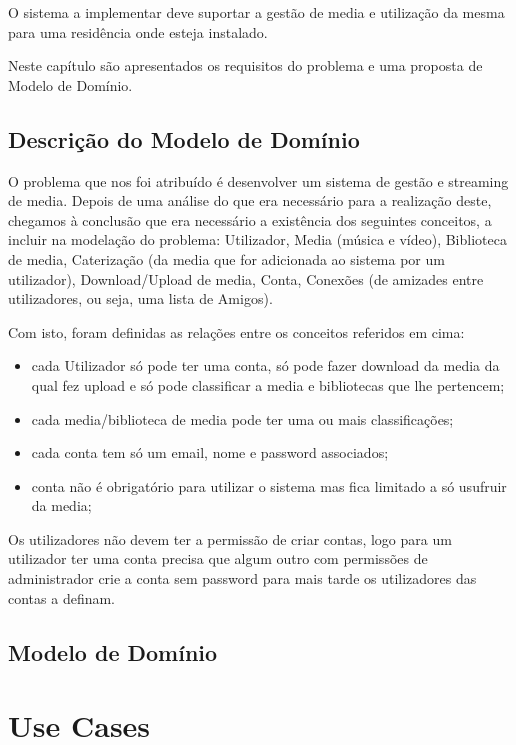 \documentclass[a4paper]{report}
\begin{document}
O sistema a implementar deve suportar a gestão de media e utilização da mesma
para uma residência onde esteja instalado.

Neste capítulo são apresentados os requisitos do problema e uma proposta de 
Modelo de Domínio.

\section{Descrição do Modelo de Domínio}

O problema que nos foi atribuído é desenvolver um sistema de gestão e streaming
de media. Depois de uma análise do que era necessário para a realização deste,
chegamos à conclusão que era necessário a existência dos seguintes conceitos, a
incluir na modelação do problema: Utilizador, Media (música e vídeo),
Biblioteca de media, Caterização (da media que for adicionada ao sistema por
um utilizador), Download/Upload de media, Conta, Conexões (de amizades entre utilizadores, ou seja, uma lista de Amigos).

Com isto, foram definidas as relações entre os conceitos referidos em cima:
\begin{itemize}
    \item cada Utilizador só pode ter uma conta, só pode fazer download da
        media da qual fez upload e só pode classificar a media e bibliotecas
        que lhe pertencem;
    \item cada media/biblioteca de media pode ter uma ou mais classificações;
    \item cada conta tem só um email, nome e password associados;
    \item conta não é obrigatório para utilizar o sistema mas fica limitado 
        a só usufruir da media;
\end{itemize}
Os utilizadores não devem ter a permissão de criar contas, logo para um
utilizador ter uma conta precisa que algum outro com permissões de
administrador crie a conta sem password para mais tarde os utilizadores
das contas a definam.

\section{Modelo de Domínio}

\chapter{Use Cases}
\end{document}
